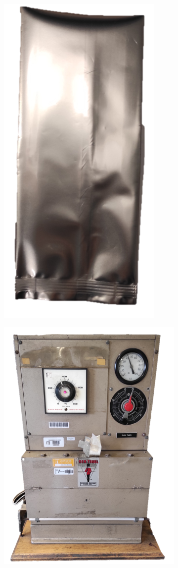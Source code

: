 \begin{refsection}
 \begin{figure}[htbp]
    \centering
    \begin{subfigure}[b]{0.3\linewidth}           \centering
        \includegraphics[width=0.5\linewidth]{Documento_Latex/Tesis_2/Imagenes/Non_Sealed_Bag.png}
        \caption{ }
        \label{fig:non_sealed_bag}
    \end{subfigure}
    \begin{subfigure}[b]{0.3\linewidth}
        \centering
        \includegraphics[width=0.8\linewidth]{Documento_Latex/Tesis_2/Imagenes/Sealer.png}

\end{subfigure}
\end{figure}
\end{refsection}
